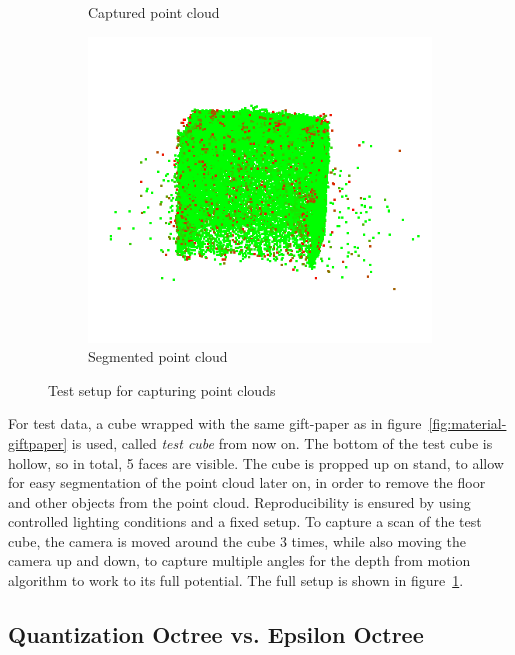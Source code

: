 \begin{figure}[h!tbp]
\begin{subfigure}[b]{0.33\textwidth}
        \caption{Captured point cloud}
    \end{subfigure}%
    \begin{subfigure}[b]{0.33\textwidth}
        \centering
        \includegraphics[width=0.9\linewidth]{images/test-setup-segmented}
        \caption{Segmented point cloud}
    \end{subfigure}%
    \caption{Test setup for capturing point clouds}
    \label{fig:test-setup}
\end{figure}

For test data, a cube wrapped with the same gift-paper as in figure~\ref{fig:material-giftpaper} is used, called \textit{test cube} from now on.
The bottom of the test cube is hollow, so in total, 5 faces are visible.
The cube is propped up on stand, to allow for easy segmentation of the point cloud later on,
in order to remove the floor and other objects from the point cloud.
Reproducibility is ensured by using controlled lighting conditions and a fixed setup.
To capture a scan of the test cube, the camera is moved around the cube 3 times, while also moving the camera up and down,
to capture multiple angles for the depth from motion algorithm to work to its full potential.
The full setup is shown in figure~\ref{fig:test-setup}.

\subsection{Quantization Octree vs. Epsilon Octree}\label{subsec:quantization-octree-vs.-epsilon-octree}

